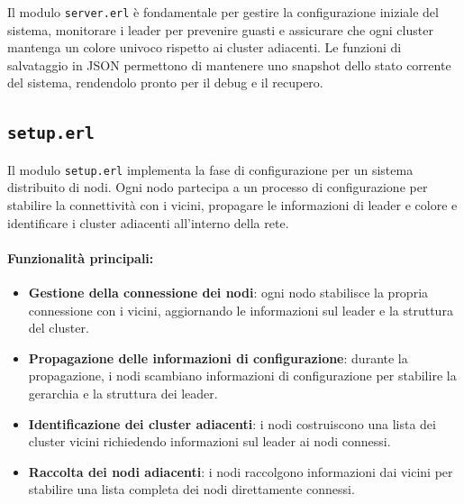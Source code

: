 \documentclass[12pt, a4paper]{report}
\begin{document}
\noindent
Il modulo \texttt{server.erl} \`e fondamentale per gestire la configurazione iniziale del sistema, monitorare i leader per prevenire guasti e assicurare che ogni cluster mantenga un colore univoco rispetto ai cluster adiacenti. Le funzioni di salvataggio in JSON permettono di mantenere uno snapshot dello stato corrente del sistema, rendendolo pronto per il debug e il recupero.

\subsection{\texttt{setup.erl}}

Il modulo \texttt{setup.erl} implementa la fase di configurazione per un sistema distribuito di nodi. Ogni nodo partecipa a un processo di configurazione per stabilire la connettività con i vicini, propagare le informazioni di leader e colore e identificare i cluster adiacenti all'interno della rete.

\paragraph{Funzionalità principali:}
\begin{itemize}
    \item \textbf{Gestione della connessione dei nodi}: ogni nodo stabilisce la propria connessione con i vicini, aggiornando le informazioni sul leader e la struttura del cluster.
    \item \textbf{Propagazione delle informazioni di configurazione}: durante la propagazione, i nodi scambiano informazioni di configurazione per stabilire la gerarchia e la struttura dei leader.
    \item \textbf{Identificazione dei cluster adiacenti}: i nodi costruiscono una lista dei cluster vicini richiedendo informazioni sul leader ai nodi connessi.
    \item \textbf{Raccolta dei nodi adiacenti}: i nodi raccolgono informazioni dai vicini per stabilire una lista completa dei nodi direttamente connessi.
\end{itemize}
\end{document}
